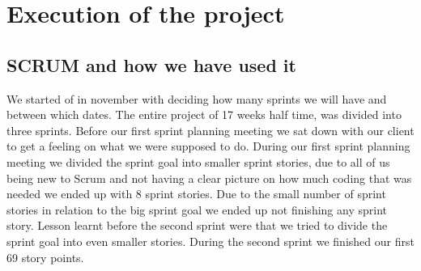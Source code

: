 


\section{Execution of the project}
\subsection{SCRUM and how we have used it}
We started of in november with deciding how many sprints we will have and between which dates.
The entire project of 17 weeks half time, was divided into three sprints.
Before our first sprint planning meeting we sat down with our client to get a feeling on what we were supposed to do.
During our first sprint planning meeting we divided the sprint goal into smaller sprint stories, due to all of us being new to Scrum and not having a clear picture on how much coding that was needed we ended up with 8 sprint stories.
Due to the small number of sprint stories in relation to the big sprint goal we ended up not finishing any sprint story.
Lesson learnt before the second sprint were that we tried to divide the sprint goal into even smaller stories.
During the second sprint we finished our first 69 story points. 

